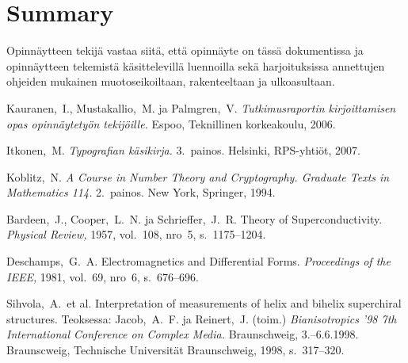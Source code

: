 \documentclass[english,12pt,a4paper,dvips]{article}
\begin{document}
\section{Summary} 

Opinnäytteen tekijä vastaa siitä, että opinnäyte on tässä dokumentissa
ja opinnäytteen tekemistä käsittelevillä luennoilla sekä
harjoituksissa annettujen ohjeiden mukainen muotoseikoiltaan,
rakenteeltaan ja ulkoasultaan.



\clearpage
\begin{thebibliography}{99}

 Kauranen,\ I., Mustakallio,\ M. ja Palmgren,\ V.
  \textit{Tutkimusraportin kirjoittamisen opas opinnäytetyön
    tekijöille.}  Espoo, Teknillinen korkeakoulu, 2006.

 Itkonen,\ M. \textit{Typografian käsikirja.} 3.\
  painos.  Helsinki, RPS-yhtiöt, 2007.

 Koblitz,\ N. \textit{A Course in Number Theory and
    Cryptography. Graduate Texts in Mathematics 114.}  2.\ painos. New
  York, Springer, 1994.

\bibitem{bcs} Bardeen,\ J., Cooper,\ L.\ N. ja Schrieffer,\ J.\ R.
  Theory of Superconductivity. \textit{Physical Review,} 1957, vol.\
  108, nro~5, s.\ 1175--1204.

 Deschamps,\ G.\ A. Electromagnetics and
  Differential Forms. \textit{Proceedings of the IEEE,} 1981, vol.\
  69, nro~6, s.\ 676--696.

\bibitem{Sihvola} Sihvola,\ A.\ et al.
  \foreignlanguage{english}{Interpretation of measurements of helix 
and bihelix superchiral structures.}  Teoksessa: Jacob,\ A.\ F. ja
  Reinert,\ J. (toim.) \textit{Bianisotropics '98 7th International
    Conference on Complex Media.}  Braunschweig, 3.--6.6.1998.
  Braunscweig, Technische Universität Braunschweig, 1998, s.\
  317--320.


\end{thebibliography}
\end{document}
